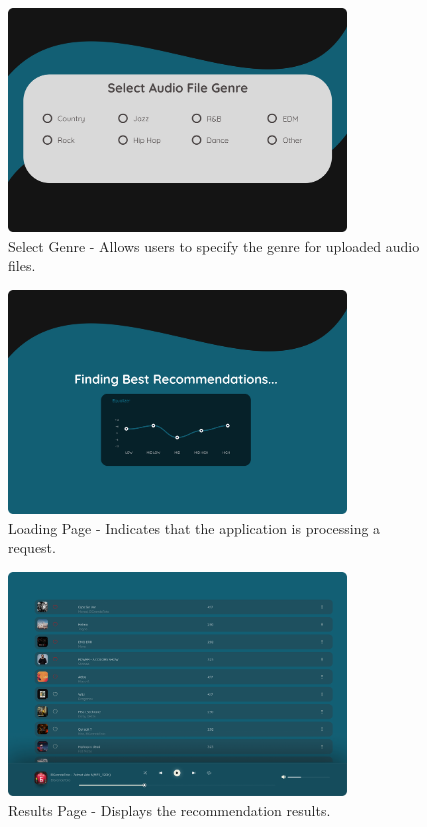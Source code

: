 \documentclass[12pt, titlepage]{article}
\begin{document}
\begin{figure}[h!]
    \centering
    \includegraphics[width=0.8\textwidth]{UI_Images/Select_Genre.png}
    \caption{Select Genre - Allows users to specify the genre for uploaded audio files.}
    \label{fig:select_genre}
\end{figure}

\begin{figure}[h!]
  \centering
  \includegraphics[width=0.8\textwidth]{UI_Images/Loading_Page.png}
  \caption{Loading Page - Indicates that the application is processing a request.}
  \label{fig:loading_page}
\end{figure}

\begin{figure}[h!]
  \centering
  \includegraphics[width=0.8\textwidth]{UI_Images/Results_Page.png}
  \caption{Results Page - Displays the recommendation results.}
  \label{fig:results_page}
\end{figure}
\end{document}
